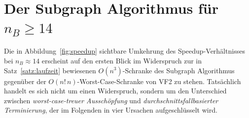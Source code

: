 \documentclass[a4paper,12pt, twoside]{report}
\theoremstyle{definition}
\begin{document}
\section{Der Subgraph Algorithmus für $n_B\ge 14$}
\label{sec:ursachen}

Die in Abbildung~\ref{fig:speedup} sichtbare Umkehrung des Speedup-Verhältnisses bei $n_B\approx 14$ erscheint auf den ersten Blick im Widerspruch zur in Satz~\ref{satz:laufzeit} bewiesenen $O(n^3)$-Schranke des Subgraph Algorithmus gegenüber der $O(n!\,n)$-Worst-Case-Schranke von VF2 \cite{cordella2004} zu stehen. Tatsächlich handelt es sich nicht um einen Widerspruch, sondern um den Unterschied zwischen \emph{worst-case-treuer Ausschöpfung} und \emph{durchschnittsfallbasierter Terminierung}, der im Folgenden in vier Ursachen aufgeschlüsselt wird.
\end{document}
